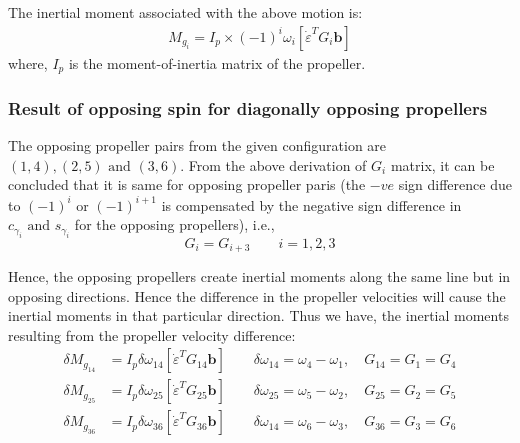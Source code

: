 %
The inertial moment associated with the above motion is:
\begin{align*}
    M_{g_i} =  I_p \times (-1)^{i} \omega_i \left[\dot \varepsilon^T  G_i \pmb b \right]
\end{align*}
where, $I_p$ is the moment-of-inertia matrix of the propeller.
%
\subsubsection{Result of opposing spin for diagonally opposing propellers}
%
The opposing propeller pairs from the given configuration are $(1, 4), (2, 5) \text{ and } (3, 6)$. From the above derivation of $G_i$ matrix, it can be concluded that it is same for opposing propeller paris (the $-ve$ sign difference due to $(-1)^i$ or $(-1)^{i+1}$ is compensated by the negative sign difference in $c_{\gamma_i} \text{ and } s_{\gamma_i}$ for the opposing propellers), i.e.,
$$ G_{i} = G_{i+3} \qquad i = 1, 2, 3$$

Hence, the opposing propellers create inertial moments along the same line but in opposing directions. Hence the difference in the propeller velocities will cause the inertial moments in that particular direction. Thus we have, the inertial moments resulting from the propeller velocity difference:
%
\begin{align*}
    \delta M_{g_{14}} &=   I_p \delta \omega_{14} \left[\dot \varepsilon^T  G_{1 4} \pmb b \right] \qquad \delta \omega_{14} = \omega_4 - \omega_1, \quad G_{14} = G_1 = G_4\\
    \delta M_{g_{25}} &=   I_p \delta \omega_{25} \left[\dot \varepsilon^T  G_{2 5} \pmb b \right] \qquad \delta \omega_{25} = \omega_5 - \omega_2, \quad G_{25} = G_2 = G_5\\
    \delta M_{g_{36}} &=   I_p \delta \omega_{36} \left[\dot \varepsilon^T  G_{3 6} \pmb b \right] \qquad \delta \omega_{14} = \omega_6 - \omega_3, \quad G_{36} = G_3 = G_6\\
\end{align*}
%
